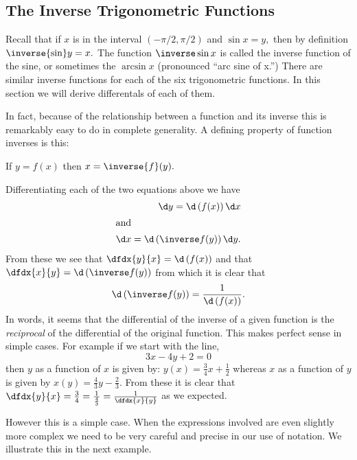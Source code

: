 \subsection{The Inverse Trigonometric Functions}
\label{subsec:inverse-trig-funct}
Recall that if $x$ is in the interval $(-\pi/2,\pi/2)$ and  $\sin x =
y,$ then by definition 
$\inverse{\sin} y = x.$ The function $\inverse\sin x$ is called the
inverse function of the sine, or sometimes the $\arcsin x$ (pronounced
``arc sine of x.'') There are similar inverse functions for each of
the six trigonometric functions. In this section we will derive
differentals  of each of them.

In fact, because of the relationship between a function and its
inverse this is remarkably easy to do in complete generality. A
defining property of function inverses is this: \\[1mm]
\centerline{If $y=f(x)$ then $x=\inverse{f}(y).$}
Differentiating each of the two  equations above we have 
\begin{align}
   \d y = \d\left(f(x)\right)\d x  \label{eq:Dependentx} \\
\intertext{and}
\d x =\d\left(\inverse f(y)\right)\d y.\label{eq:Dependenty}
\end{align}
From these we see that $\dfdx{y}{x}=\d\left(f(x)\right)$ and that 
$\dfdx{x}{y}=\d\left(\inverse f(y)\right)$ from which it is clear that 
\begin{equation}
\d\left(\inverse f(y)\right)=
\frac{1}{\d\left(f(x)\right)}.\label{eq:ReciprocalInverseDeriv}
\end{equation}
In words, it seems that the differential of the inverse of a given
function is the \emph{reciprocal} of the differential of the original
function. This makes perfect sense in simple cases. For example if we
start with the line, 
\[
3x-4y+2=0
\]
then $y$ as a function of $x$ is given by: $y(x) = \frac34x+\frac12$
whereas $x$ as a function of $y$ is given by $x(y) =
\frac43y-\frac23.$
From these it is clear that $\dfdx{y}{x} = \frac34 =
\frac{1}{\frac43}=\frac{1}{\dfdx{x}{y}}$ as we expected. 

However this is a simple case. When the expressions involved are even
slightly more complex we need to be very careful and precise in our
use of notation. We illustrate this in the next example.

